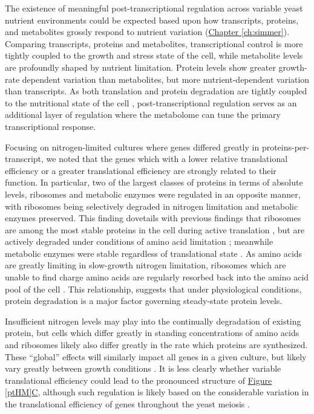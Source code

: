 The existence of meaningful post-transcriptional regulation across variable yeast nutrient environments could be expected based upon how transcripts, proteins, and metabolites \cite{Boer:2010fb} grossly respond to nutrient variation (\hyperref[ch:simmer]{Chapter \ref{ch:simmer}}). Comparing transcripts, proteins and metabolites, transcriptional control is more tightly coupled to the growth and stress state of the cell, while metabolite levels are profoundly shaped by nutrient limitation. Protein levels show greater growth-rate dependent variation than metabolites, but more nutrient-dependent variation than transcripts. As both translation and protein degradation are tightly coupled to the nutritional state of the cell \cite{Klumpp:2009ic, Takeshige:1992wm}, post-transcriptional regulation serves as an additional layer of regulation where the metabolome can tune the primary transcriptional response.

Focusing on nitrogen-limited cultures where genes differed greatly in proteins-per-transcript, we noted that the genes which with a lower relative translational efficiency or a greater translational efficiency are strongly related to their function.  In particular, two of the largest classes of proteins in terms of absolute levels, ribosomes and metabolic enzymes were regulated in an opposite manner, with ribosomes being selectively degraded in nitrogen limitation and metabolic enzymes preserved.  This finding dovetails with previous findings that ribosomes are among the most stable proteins in the cell during active translation \cite{Belle:2006hv}, but are actively degraded under conditions of amino acid limitation \cite{Natarajan:2001ke, Washburn:2003ff, Zundel:2009dy}; meanwhile metabolic enzymes were stable regardless of translational state \cite{Belle:2006hv}.  As amino acids are greatly limiting in slow-growth nitrogen limitation, ribosomes which are unable to find charge amino acids are regularly resorbed back into the amino acid pool of the cell \cite{Zundel:2009dy, Xu:2013do}.  This relationship, suggests that under physiological conditions, protein degradation is a major factor governing steady-state protein levels.

Insufficient nitrogen levels may play into the continually degradation of existing protein, but cells which differ greatly in standing concentrations of amino acids and ribosomes likely also differ greatly in the rate which proteins are synthesized. These ``global'' effects will similarly impact all genes in a given culture, but likely vary greatly between growth conditions \cite{Klumpp:2009ic}. It is less clearly whether variable translational efficiency could lead to the pronounced structure of \hyperref[ptHM]{Figure \ref{ptHM}C}, although such regulation is likely based on the considerable variation in the translational efficiency of genes throughout the yeast meiosis \cite{Brar:2012ig}. 

